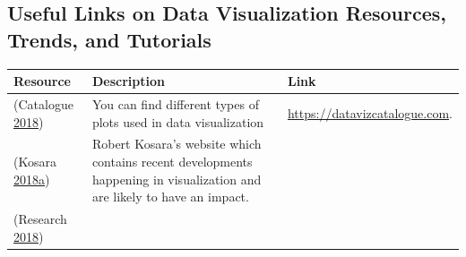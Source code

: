 \documentclass[]{book}
\begin{document}
\hypertarget{useful-links-on-data-visualization-resources-trends-and-tutorials}{%
\subsection{Useful Links on Data Visualization Resources, Trends, and Tutorials}\label{useful-links-on-data-visualization-resources-trends-and-tutorials}}

\begin{longtable}[]{@{}lll@{}}
\toprule
\begin{minipage}[b]{0.15\columnwidth}\raggedright
\textbf{Resource}\strut
\end{minipage} & \begin{minipage}[b]{0.28\columnwidth}\raggedright
\textbf{Description}\strut
\end{minipage} & \begin{minipage}[b]{0.48\columnwidth}\raggedright
\textbf{Link}\strut
\end{minipage}\tabularnewline
\midrule
\endhead
\begin{minipage}[t]{0.15\columnwidth}\raggedright
(Catalogue \protect\hyperlink{ref-charts_viz}{2018})\strut
\end{minipage} & \begin{minipage}[t]{0.28\columnwidth}\raggedright
You can find different types of plots used in data visualization\strut
\end{minipage} & \begin{minipage}[t]{0.48\columnwidth}\raggedright
\href{https://datavizcatalogue.com/search.html}{https://datavizcatalogue.com}.\strut
\end{minipage}\tabularnewline
\begin{minipage}[t]{0.15\columnwidth}\raggedright
(Kosara \protect\hyperlink{ref-eagereyes_viz}{2018}\protect\hyperlink{ref-eagereyes_viz}{a})\strut
\end{minipage} & \begin{minipage}[t]{0.28\columnwidth}\raggedright
Robert Kosara's website which contains recent developments happening in visualization and are likely to have an impact.\strut
\end{minipage} & \begin{minipage}[t]{0.48\columnwidth}\raggedright
\strut
\end{minipage}\tabularnewline
\begin{minipage}[t]{0.15\columnwidth}\raggedright
(Research \protect\hyperlink{ref-research_viz}{2018})\strut
\end{minipage} & \begin{minipage}[t]{0.28\columnwidth}\raggedright

\end{minipage}
\end{longtable}
\end{document}
